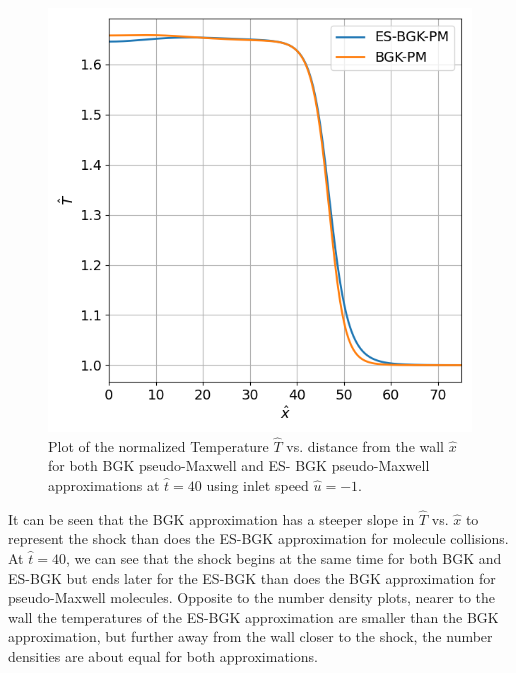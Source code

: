 \documentclass[a4paper]{article}
\begin{document}
\clearpage
\begin{figure}[hbt!]
    \centering
    \includegraphics[width=14cm]{plots/problem_g_T.png}
    \caption{\centering Plot of the normalized Temperature $\hat{T}$ vs. distance from the wall $\hat{x}$ for both BGK pseudo-Maxwell and ES- BGK pseudo-Maxwell approximations at $\hat{t} = 40$ using inlet speed $\hat{u} = -1$.}
    \label{problem_g_T}
\end{figure}
It can be seen that the BGK approximation has a steeper slope in $\hat{T}$ vs. $\hat{x}$ to represent the shock than does the ES-BGK approximation for molecule collisions. At $\hat{t} = 40$, we can see that the shock begins at the same time for both BGK and ES-BGK but ends later for the ES-BGK than does the BGK approximation for pseudo-Maxwell molecules. Opposite to the number density plots, nearer to the wall the temperatures of the ES-BGK approximation are smaller than the BGK approximation, but further away from the wall closer to the shock, the number densities are about equal for both approximations. 
\clearpage
\end{document}
